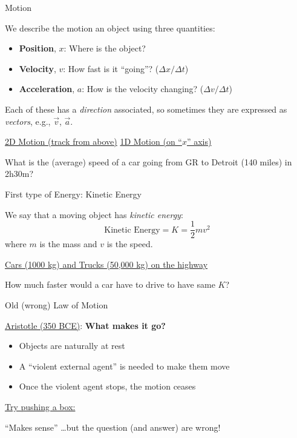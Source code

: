 \documentclass[12pt]{beamer}
\begin{document}
\begin{frame}{Motion}

We describe the motion an object using three quantities:
	\begin{itemize}
	\item[] {\bf Position}, $x$: Where is the object?
	\item[] {\bf Velocity}, $v$: How fast is it ``going''? ($\Delta x / \Delta t$)
	\item[] {\bf Acceleration}, $a$: How is the velocity changing?  ($\Delta v / \Delta t$)
	\end{itemize}
Each of these has a {\em direction} associated, so sometimes they are expressed as {\em vectors}, e.g., $\vec{v}$, $\vec{a}$.

\vspace{0.25cm}

\underline{2D Motion (track from above)} \hfill \underline{1D Motion (on ``$x$'' axis)}

\vspace{3.5cm}

What is the (average) speed of a car going from GR to Detroit (140 miles) in 2h30m?

\end{frame}
\begin{frame}{First type of Energy: Kinetic Energy}

We say that a moving object has {\em kinetic energy}:
	\begin{equation*}
	\text{Kinetic Energy} = K = \frac{1}{2} m v^2
	\end{equation*}
where $m$ is the mass and $v$ is the speed.

\vspace{0.5cm}

\underline{Cars (1000 kg) and Trucks (50,000 kg) on the highway}

\vspace{3.5cm}

How much faster would a car have to drive to have same $K$?

\end{frame}
\begin{frame}{Old (wrong) Law of Motion}

\underline{Aristotle (350 BCE)}: {\bf What makes it go?}
	\begin{itemize}
	\item Objects are naturally at rest
	\item A ``violent external agent'' is needed to make them move
	\item Once the violent agent stops, the motion ceases
	\end{itemize}
\underline{Try pushing a box:}

\vspace{4cm}

``Makes sense'' \ldots but the question (and answer) are wrong!

\end{frame}
\end{document}
